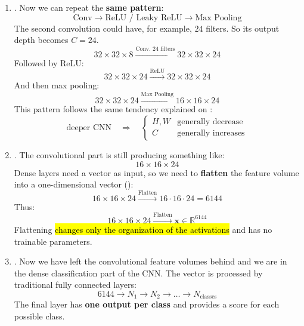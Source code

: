 \begin{enumerate}
    \item {}. Now we can repeat the \textbf{same pattern}:
    \begin{equation*}
        \text{Conv} \to \text{ReLU / Leaky ReLU} \to \text{Max Pooling}
    \end{equation*}
    The second convolution could have, for example, $24$ filters. So its output depth becomes $C = 24$.
    \begin{equation*}
        32 \times 32 \times 8 \xrightarrow{\text{Conv. 24 filters}} 32 \times 32 \times 24
    \end{equation*}
    Followed by ReLU:
    \begin{equation*}
        32 \times 32 \times 24 \xrightarrow{\text{ReLU}} 32 \times 32 \times 24
    \end{equation*}
    And then max pooling:
    \begin{equation*}
        32 \times 32 \times 24 \xrightarrow{\text{Max Pooling}} 16 \times 16 \times 24
    \end{equation*}
    This pattern follows the same tendency explained on :
    \begin{equation*}
        \text{deeper CNN} \quad \Rightarrow \quad \begin{cases}
            H, W & \text{generally decrease} \\
            C    & \text{generally increases}
        \end{cases}
    \end{equation*}


    \item {}. The convolutional part is still producing something like:
    \begin{equation*}
        16 \times 16 \times 24
    \end{equation*}
    Dense layers need a vector as input, so we need to \textbf{flatten} the feature volume into a one-dimensional vector ():
    \begin{equation*}
        16 \times 16 \times 24 \xrightarrow{\text{Flatten}} 16 \cdot 16 \cdot 24 = 6144
    \end{equation*}
    Thus:
    \begin{equation*}
        16 \times 16 \times 24 \xrightarrow{\text{Flatten}} \mathbf{x} \in \mathbb{R}^{6144}
    \end{equation*}
    Flattening \hl{changes only the organization of the activations} and has no trainable parameters.


    \item {}. Now we have left the convolutional feature volumes behind and we are in the dense classification part of the CNN. The vector is processed by traditional fully connected layers:
    \begin{equation*}
        6144 \to N_1 \to N_2 \to \dots \to N_{\text{classes}}
    \end{equation*}
    The final layer has \textbf{one output per class} and provides a score for each possible class.
\end{enumerate}

